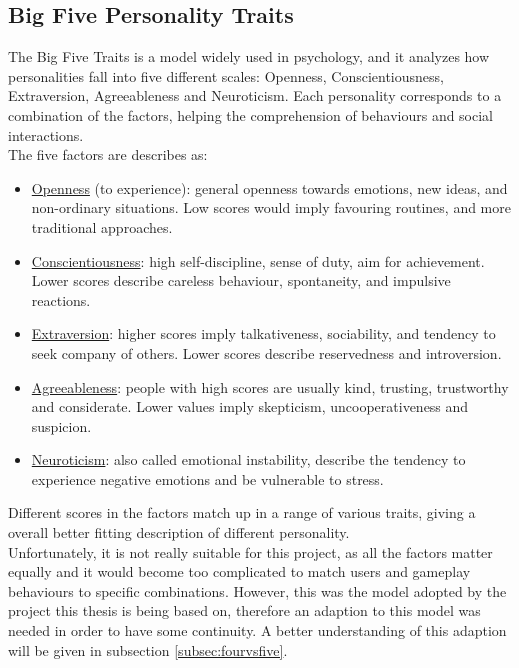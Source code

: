 \subsection{Big Five Personality Traits}\label{subsubsec:big5}
The Big Five Traits is a model widely used in psychology\cite{goldberg1993structure}, and it analyzes how personalities fall into five different scales: Openness, Conscientiousness, Extraversion, Agreeableness and Neuroticism. Each personality corresponds to a combination of the factors, helping the comprehension of behaviours and social interactions.\\
The five factors are describes as:
\begin{itemize}
\item \underline{Openness} (to experience): general openness towards emotions, new ideas, and non-ordinary situations. Low scores would imply favouring routines, and more traditional approaches.
\item \underline{Conscientiousness}: high self-discipline, sense of duty, aim for achievement. Lower scores describe careless behaviour, spontaneity, and impulsive reactions.
\item \underline{Extraversion}: higher scores imply talkativeness, sociability, and tendency to seek company of others. Lower scores describe reservedness and introversion. 
\item \underline{Agreeableness}: people with high scores are usually kind, trusting, trustworthy and considerate. Lower values imply skepticism, uncooperativeness and suspicion.
\item \underline{Neuroticism}: also called emotional instability, describe the tendency to experience negative emotions and be vulnerable to stress. 
\end{itemize}
Different scores in the factors match up in a range of various traits, giving a overall better fitting description of different personality.\cite{durupinar2008creating}\\
Unfortunately, it is not really suitable for this project, as all the factors matter equally and it would become too complicated to match users and gameplay behaviours to specific combinations. However, this was the model adopted by the project this thesis is being based on, therefore an adaption to this model was needed in order to have some continuity. A better understanding of this adaption will be given in subsection \ref{subsec:fourvsfive}. 
